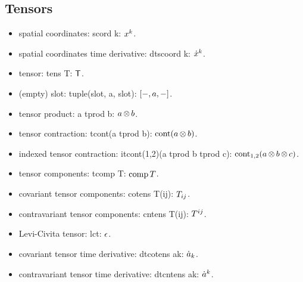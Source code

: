 \begin{multicols}{2}
\subsection{Tensors}
\begin{itemize}
\item spatial coordinates: scord k: ${x}^{k}$.
\item spatial coordinates time derivative: dtscoord k: ${\dot{x}}^{k}$.
\item tensor: tens T: $\mathsf{T}$.
\item (empty) slot: tuple(slot, a, slot): $\left[{-, a, -}\right]$.
\item tensor product: a tprod b: $a\operatorname{\otimes} b$.
\item tensor contraction: tcont(a tprod b): $\operatorname{cont}(a \operatorname{\otimes} b)$.
\item indexed tensor contraction: itcont(1,2)(a tprod b tprod c): $\operatorname{cont}_{1,2}(a \operatorname{\otimes} b \operatorname{\otimes} c)$.
\item tensor components: tcomp T: $\operatorname{comp} T$.
\item covariant tensor components: cotens T(ij): ${T}_{ij}$.
\item contravariant tensor components: cntens T(ij): ${T}^{ij}$.
\item Levi-Civita tensor: lct: $\epsilon$.
\item covariant tensor time derivative: dtcotens ak: $\dot{a}_{k}$.
\item contravariant tensor time derivative: dtcntens ak: $\dot{a}^{k}$.
\end{itemize}



\end{multicols}
